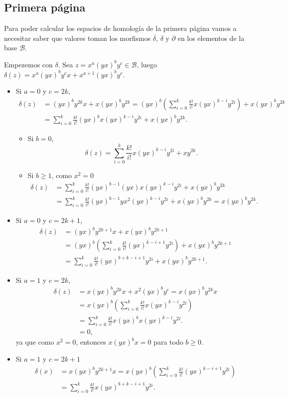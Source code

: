 \documentclass[a4paper,oneside,fleqn,11pt]{article}
\newcommand\base{\mathcal{B}}
\numberwithin{prop}{subsection}
\begin{document}
\subsection{Primera página}
Para poder calcular los espacios de homología de la primera página
vamos a necesitar saber que valores toman los morfismos $\overline{\delta}$, $\delta$ y $\partial$
en los elementos de la base $\mathcal{B}$.

Empezemos con $\delta$. Sea $z = x^a(yx)^by^c \in \base$, luego $\delta(z) = x^a(yx)^by^cx + x^{a + 1}(yx)^by^c$.
\begin{itemize}
\item Si $a = 0$ y $c = 2k$,
\begin{align*}
	\delta(z) &= (yx)^by^{2k}x + x(yx)^by^{2k} = (yx)^b\left( \sum_{i = 0}^k\frac{k!}{i!}x(yx)^{k - i}y^{2i}\right) + x(yx)^by^{2k} \\
	&= \sum_{i = 0}^k\frac{k!}{i!}(yx)^bx(yx)^{k - i}y^{2i} + x(yx)^by^{2k}. 
\end{align*}
\begin{itemize}
\item Si $b = 0$,
\[
	\delta(z) = \sum_{i = 0}^k\frac{k!}{i!}x(yx)^{k - i}y^{2i} + xy^{2k}.
\]
\item Si $b \geq 1$, como $x^2 = 0$
\begin{align*}
	\delta(z) &= \sum_{i = 0}^k\frac{k!}{i!}(yx)^{b-1}(yx)x(yx)^{k - i}y^{2i} + x(yx)^by^{2k} \\
	&= \sum_{i = 0}^k\frac{k!}{i!}(yx)^{b-1}yx^2(yx)^{k - i}y^{2i} + x(yx)^by^{2k} = x(yx)^by^{2k}.
\end{align*}
\end{itemize}
\item Si $a = 0$ y $c = 2k + 1$,
\begin{align*}
	\delta(z) &= (yx)^by^{2k + 1}x + x(yx)^by^{2k + 1} \\
	&= (yx)^b\left( \sum_{i = 0}^k\frac{k!}{i!}(yx)^{k - i + 1}y^{2i}\right) + x(yx)^by^{2k + 1} \\
	&= \sum_{i = 0}^k\frac{k!}{i!}(yx)^{b + k - i + 1}y^{2i} + x(yx)^by^{2k + 1}.
\end{align*}
\item Si $a = 1$ y $c = 2k$,
	\begin{align*}
		\delta(z) &= x(yx)^by^{2k}x + x^2(yx)^by^c = x(yx)^by^{2k}x \\
		&= x(yx)^b\left( \sum_{i = 0}^k\frac{k!}{i!}x(yx)^{k - i}y^{2i}\right) \\
		&= \sum_{i = 0}^k\frac{k!}{i!}x(yx)^bx(yx)^{k - i}y^{2i}. \\
		& = 0,
	\end{align*}
	ya que como $x^2 = 0$, entonces $x(yx)^bx = 0$ para todo $b \geq 0$.
\item Si $a = 1$ y $c = 2k + 1$
	\begin{align*}
		\delta(x) &= x(yx)^by^{2k + 1}x = x(yx)^b\left( \sum_{i = 0}^k\frac{k!}{i!}(yx)^{k - i + 1}y^{2i}\right) \\
		&= \sum_{i = 0}^k\frac{k!}{i!}x(yx)^{b + k - i + 1}y^{2i}.
	\end{align*}
\end{itemize}
\end{document}
